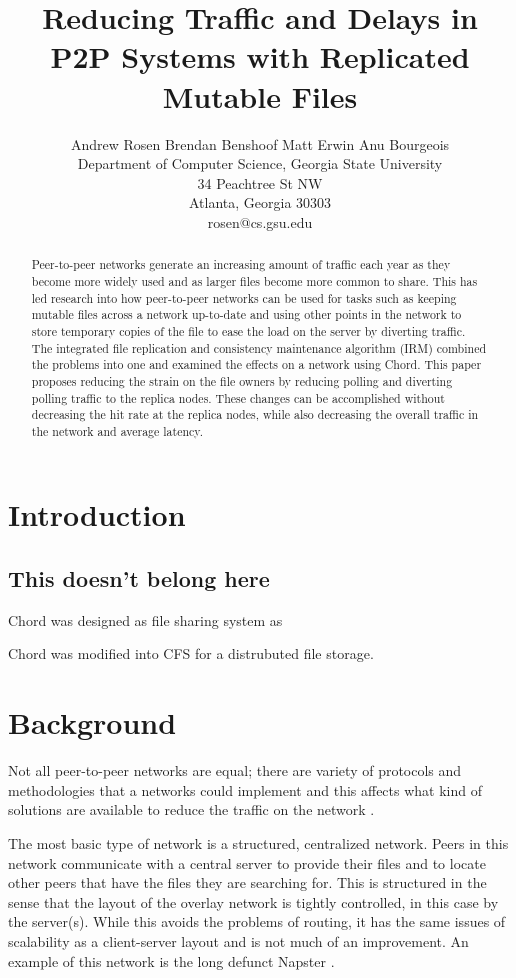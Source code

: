 \documentclass[10pt, conference, compsocconf, letterpaper]{IEEEtran}
\title{Reducing Traffic and Delays in P2P Systems with Replicated Mutable Files}
\author{
Andrew Rosen \qquad Brendan Benshoof \qquad Matt Erwin \qquad Anu Bourgeois  \\Department of Computer Science, Georgia State University\\ 34 Peachtree St NW \\ Atlanta, Georgia 30303\\  rosen@cs.gsu.edu }
\begin{document}
\maketitle

\begin{abstract}
Peer-to-peer networks generate an increasing amount of traffic each year as they become more widely used and as larger files become more common to share. This has led research into how peer-to-peer networks can be used for tasks such as keeping mutable files across a network up-to-date and using other points in the network to store temporary copies of the file to ease the load on the server by diverting traffic. The integrated file replication and consistency maintenance algorithm (IRM) combined the problems into one and examined the effects on a network using Chord. This paper proposes reducing the strain on the file owners by reducing polling and diverting  polling traffic to the replica nodes.  These changes can be accomplished without decreasing the hit rate at the replica nodes, while also decreasing the overall traffic in the network and average latency.
\end{abstract}



\section{Introduction}

\subsection{This doesn't belong here}
Chord was designed as file sharing system as

Chord was modified into CFS for a distrubuted file storage.

\section{Background}
Not all peer-to-peer networks are equal; there are variety of protocols and methodologies that a networks could implement and this affects what kind of solutions are available to reduce the traffic on the network    \cite{SurveyCompare} \cite{Overview}.

The most basic type of network is a structured, centralized  network.  Peers in this network communicate with a central server to provide their files and to locate other peers that have the files they are searching for.  This is structured in the sense that the layout of the overlay network is tightly controlled, in this case by the server(s). While this avoids the problems of routing, it has the same issues of scalability as a client-server layout and is not much of an improvement. An example of this network is the long defunct Napster  \cite{SurveyCompare} \cite{Overview}.
\end{document}

